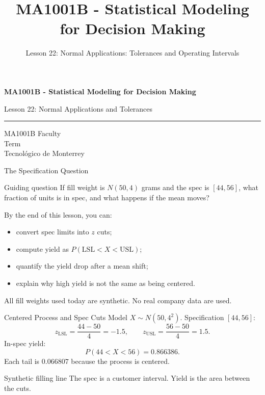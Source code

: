 \documentclass[aspectratio=169,10pt,english]{beamer}
\title{MA1001B - Statistical Modeling for Decision Making}
\subtitle{Lesson 22: Normal Applications: Tolerances and Operating Intervals}
\author{}
\institute{Tecnol\'ogico de Monterrey}
\date{}
\begin{document}
\begin{frame}[plain]
  \vspace{1.2cm}
  {\Large\bfseries MA1001B - Statistical Modeling for Decision Making\par}
  \vspace{0.7cm}
  {\large Lesson 22: Normal Applications and Tolerances\par}
  \vspace{0.7cm}
  {\color{TecRojo}\rule{\textwidth}{1.2pt}}
  \vspace{0.8cm}

  MA1001B Faculty\\[0.3cm]
  Term\\[0.3cm]
  Tecnol\'ogico de Monterrey
\end{frame}

\begin{frame}{The Specification Question}
  \begin{alertblock}{Guiding question}
    If fill weight is $N(50,4)$ grams and the spec is $[44,56]$, what
    fraction of units is in spec, and what happens if the mean moves?
  \end{alertblock}

  \vspace{0.6em}
  By the end of this lesson, you can:
  \begin{itemize}
    \item convert spec limits into $z$ cuts;
    \item compute yield as $P(\mathrm{LSL}<X<\mathrm{USL})$;
    \item quantify the yield drop after a mean shift;
    \item explain why high yield is not the same as being centered.
  \end{itemize}

  \vfill
  \scriptsize All fill weights used today are synthetic. No real company data are used.
\end{frame}

\begin{frame}{Centered Process and Spec Cuts}
  \small
  Model $X\sim N(50,4^2)$. Specification $[44,56]$:
  \[
    z_{\mathrm{LSL}}=\frac{44-50}{4}=-1.5,\qquad
    z_{\mathrm{USL}}=\frac{56-50}{4}=1.5.
  \]
  In-spec yield:
  \[
    P(44<X<56)=0.866386.
  \]
  Each tail is $0.066807$ because the process is centered.

  \vspace{0.3em}
  \begin{exampleblock}{Synthetic filling line}
    The spec is a customer interval. Yield is the area between the cuts.
  \end{exampleblock}
\end{frame}
\end{document}
